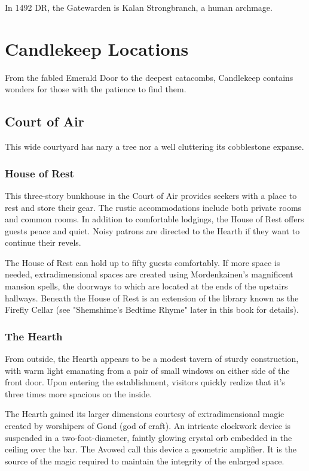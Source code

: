 \documentclass[10pt,a4paper,twoside,bg=print,twocolumn,openany,nodeprecatedcode]{dndbook}
\begin{document}
In 1492 DR, the Gatewarden is Kalan Strongbranch, a human archmage.

\section{Candlekeep Locations}
From the fabled Emerald Door to the deepest catacombs, Candlekeep contains wonders for those with the patience to find them.

\subsection{Court of Air}
This wide courtyard has nary a tree nor a well cluttering its cobblestone expanse.

\subsubsection{House of Rest}
This three-story bunkhouse in the Court of Air provides seekers with a place to rest and store their gear. The rustic accommodations include both private rooms and common rooms. In addition to comfortable lodgings, the House of Rest offers guests peace and quiet. Noisy patrons are directed to the Hearth if they want to continue their revels.

The House of Rest can hold up to fifty guests comfortably. If more space is needed, extradimensional spaces are created using Mordenkainen's magnificent mansion spells, the doorways to which are located at the ends of the upstairs hallways. Beneath the House of Rest is an extension of the library known as the Firefly Cellar (see "Shemshime's Bedtime Rhyme" later in this book for details).

\subsubsection{The Hearth}
From outside, the Hearth appears to be a modest tavern of sturdy construction, with warm light emanating from a pair of small windows on either side of the front door. Upon entering the establishment, visitors quickly realize that it's three times more spacious on the inside.

The Hearth gained its larger dimensions courtesy of extradimensional magic created by worshipers of Gond (god of craft). An intricate clockwork device is suspended in a two-foot-diameter, faintly glowing crystal orb embedded in the ceiling over the bar. The Avowed call this device a geometric amplifier. It is the source of the magic required to maintain the integrity of the enlarged space.
\end{document}

